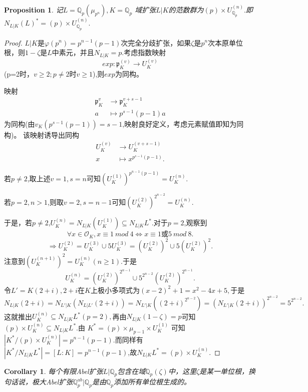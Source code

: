 \documentclass[UTF8]{article}
\newtheorem{cor}{Corollary}[section]
\newtheorem{prop}{Proposition}[section]
\begin{document}
\begin{prop}
	记$L=\mathbb{Q}_{p}(\mu_{p^{n}}),K=\mathbb{Q}_{p}$
	域扩张$L|K$的范数群为$(p)\times U_{\mathbb{Q}_{p}}^{(n)}.$即$N_{L|K}(L)^{*}=(p)\times U_{\mathbb{Q}_{p}}^{(n)}.$
\end{prop}
\begin{proof}
	$L|K$是$\varphi(p^{n})=p^{n-1}(p-1)$次完全分歧扩张，如果$\zeta$是$p^{n}$次本原单位根，则$1-\zeta$是$L$中素元，并且$N_{L|K}=p.$考虑指数映射
	$$exp:\mathfrak{p}_{K}^{(v)}\rightarrow U_{K}^{(v)}$$
	(p=2时，$v\geq 2;p\neq 2$时$v\geq 1$),则$exp$为同构。
	
	映射
	\[
\begin{split}
 \mathfrak{p}_{K}^{v}&\rightarrow \mathfrak{p}_{K}^{v+s-1}\\
 a&\mapsto p^{s-1}(p-1)a
\end{split}	
\]
 为同构(由$v_{K}(p^{s-1}(p-1))=s-1$,映射良好定义，考虑元素赋值即知为同构)。
 该映射诱导出同构
 \[
 \begin{split}
 U_{K}^{(v)}&\rightarrow U_{K}^{(v+s-1)}\\
 x&\mapsto x^{p^{s-1}(p-1)}.
 \end{split}
 \]
 
	若$p\neq 2$,取上述$v=1,s=n$可知$(U_{K}^{(1)})^{p^{n-1}(p-1)}=U_{K}^{(n)}.$
	
	若$p=2,n>1$,则取$v=2,s=n-1$可知$(U_{K}^{(2)})^{2^{n-2}}=U_{K}^{(n)}.$
	
	于是，若$p\neq 2$,$U_{K}^{(n)}=N_{L|K}(U_{K}^{(1)})\subseteq N_{L|K}L^{*}$.对于$p=2$,观察到
	$$\forall x\in \mathcal{O}_{K},x\equiv 1\ mod \ 4\Leftrightarrow x\equiv 1 \text{或}5\ mod \ 8.$$
	$$
	\Rightarrow U_{K}^{(2)}=U_{K}^{(3)}\cup 5U_{K}^{(3)}=(U_{K}^{(2)})^{2}\cup 5(U_{K}^{(2)})^{2}.
	$$
	注意到$(U_{K}^{(n+1)})^{2}=U_{K}^{(n)}(n\geq 1)$.于是
	$$
	U_{K}^{(n)}=(U_{K}^{(2)})^{2^{n-1}}\cup 5^{2^{n-2}}(U_{K}^{(2)})^{2^{n-1}}.
	$$
	令$L'=K(2+i),2+i$在$K$上极小多项式为$(x-2)^{2}+1=x^{2}-4x+5,$于是
	$$
	N_{L|K}(2+i)=N_{L'|K}(N_{L|L'}(2+i))=N_{L'|K}((2+i)^{2^{n-2}})=(N_{L'|K}(2+i))^{2^{n-2}}=5^{2^{n-2}}.
	$$
	这就推出$U_{K}^{(n)}\subseteq N_{L|K}L^{*}(p=2),$再由$N_{L|K}(1-\zeta)=p$可知$(p)\times U_{K}^{(n)}\subseteq N_{L|K}L^{*}.$由
	$K^{*}=(p)\times \mu_{p-1}\times U_{K}^{(1)}$
	可知$|K^{*}/(p)\times U_{K}^{(n)}|=p^{n-1}(p-1).$而同样有$|K^{*}/N_{L|K}L^{*}|=[L:K]=p^{n-1}(p-1)$,故$N_{L|K}L^{*}=(p)\times U_{K}^{(n)}.$
\end{proof}
\begin{cor}
	每个有限Abel扩张$L|\mathbb{Q}_{p}$包含在域$\mathbb{Q}_{p}(\zeta)$中，这里$\zeta$是某一单位根，换句话说，极大Abel扩张$\mathbb{Q}_{p}^{ab}|\mathbb{Q}_{p}$是由$\mathbb{Q}_{p}$添加所有单位根生成的。
\end{cor}
\end{document}
